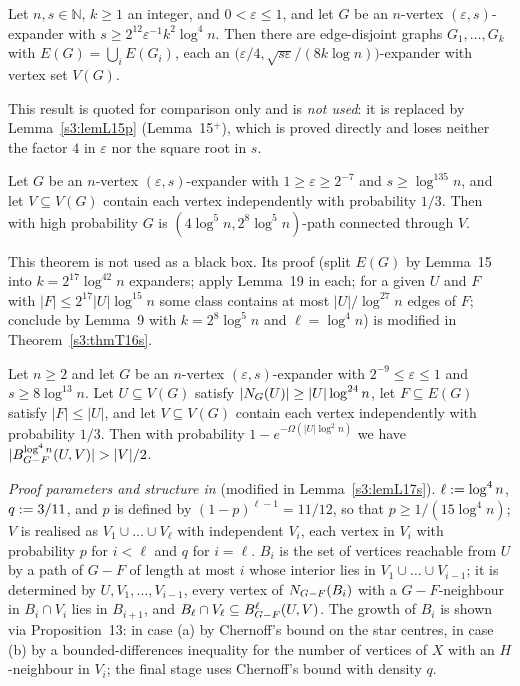 \begin{citedresult}[{\cite[Lemma~15]{BM}}]\label{s1:citLem15}
Let $n,s\in\mathbb N$, $k\ge1$ an integer, and $0<\varepsilon\le1$, and let $G$ be an $n$-vertex
$(\varepsilon,s)$-expander with $s\ge2^{12}\varepsilon^{-1}k^2\log^4n$. Then
there are edge-disjoint graphs $G_1,\dots,G_k$ with $E(G)=\bigcup_iE(G_i)$, each
an $\bigl(\varepsilon/4,\sqrt{s\varepsilon}/(8k\log n)\bigr)$-expander with vertex
set $V(G)$.

This result is quoted for comparison only and is \emph{not used}: it is replaced
by Lemma~\ref{s3:lemL15p} (Lemma~15$^+$), which is proved directly and loses
neither the factor $4$ in $\varepsilon$ nor the square root in
$s$.
\end{citedresult}

\begin{citedresult}[{\cite[Theorem~16]{BM}}]\label{s1:citThm16}
Let $G$ be an $n$-vertex $(\varepsilon,s)$-expander with
$1\ge\varepsilon\ge2^{-7}$ and $s\ge\log^{135}n$, and let $V\subseteq V(G)$
contain each vertex independently with probability $1/3$. Then with high
probability $G$ is $(4\log^5n,2^8\log^5n)$-path connected through $V$.

This theorem is not used as a black box. Its proof (split $E(G)$ by Lemma~15
into $k=2^{17}\log^{42}n$ expanders; apply Lemma~19 in each; for a given $U$ and
$F$ with $|F|\le2^{17}|U|\log^{15}n$ some class contains at most
$|U|/\log^{27}n$ edges of $F$; conclude by Lemma~9 with $k=2^8\log^5n$ and
$\ell=\log^4n$) is modified in Theorem~\ref{s3:thmT16s}.
\end{citedresult}

\begin{citedresult}[{\cite[Lemma~17]{BM}}]\label{s1:citLem17}
Let $n\ge2$ and let $G$ be an $n$-vertex $(\varepsilon,s)$-expander with
$2^{-9}\le\varepsilon\le1$ and $s\ge8\log^{13}n$. Let $U\subseteq V(G)$ satisfy
$|N_G(U)|\ge|U|\log^{24}n$, let $F\subseteq E(G)$ satisfy $|F|\le|U|$, and let
$V\subseteq V(G)$ contain each vertex independently with probability $1/3$. Then
with probability $1-e^{-\Omega(|U|\log^2n)}$ we have
$|\Ball{\log^4n}{G-F}{U,V}|>|V|/2$.

\emph{Proof parameters and structure in \cite{BM}} (modified in
Lemma~\ref{s3:lemL17s}). $\ell\mathrel{:=}\log^4n$, $q\mathrel{:=}3/11$, and $p$ is defined
by $(1-p)^{\ell-1}=11/12$, so that $p\ge1/(15\log^4n)$; $V$ is realised as
$V_1\cup\dots\cup V_\ell$ with independent $V_i$, each vertex in $V_i$ with
probability $p$ for $i<\ell$ and $q$ for $i=\ell$. $B_i$ is the set of vertices
reachable from $U$ by a path of $G-F$ of length at most $i$ whose interior lies
in $V_1\cup\dots\cup V_{i-1}$; it is determined by $U,V_1,\dots,V_{i-1}$, every
vertex of $N_{G-F}(B_i)$ with a $G-F$-neighbour in $B_i\cap V_i$ lies in
$B_{i+1}$, and $B_\ell\cap V_\ell\subseteq B^{\ell}_{G-F}(U,V)$. The growth of
$B_i$ is shown via Proposition~13: in case (a) by Chernoff's bound on the star
centres, in case (b) by a bounded-differences inequality for the number of
vertices of $X$ with an $H$-neighbour in $V_i$; the final stage uses Chernoff's
bound with density $q$.
\end{citedresult}

